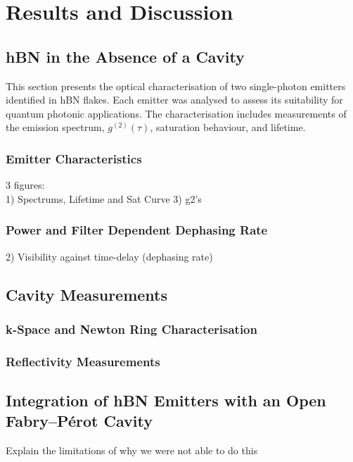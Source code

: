 \section{Results and Discussion}

\subsection{hBN in the Absence of a Cavity}

This section presents the optical characterisation of two single-photon emitters identified in hBN flakes. Each emitter was analysed to assess its suitability for quantum photonic applications. The characterisation includes measurements of the emission spectrum, $g^{(2)}(\tau)$, saturation behaviour, and lifetime. 

\subsubsection{Emitter Characteristics}

3 figures: \\
1) Spectrums, Lifetime and Sat Curve
3) g2's


\subsubsection{Power and Filter Dependent Dephasing Rate}

2) Visibility against time-delay (dephasing rate)




\subsection{Cavity Measurements}

\subsubsection{k-Space and Newton Ring Characterisation}

\subsubsection{Reflectivity Measurements}



\subsection{Integration of hBN Emitters with an Open Fabry–Pérot Cavity}

Explain the limitations of why we were not able to do this

